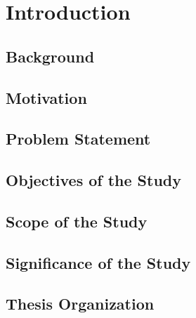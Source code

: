 \chapter{Introduction}
\label{ch1}

\section{Background}

\section{Motivation}

\section{Problem Statement}

\section{Objectives of the Study}

\section{Scope of the Study}

\section{Significance of the Study}

\section{Thesis Organization}


